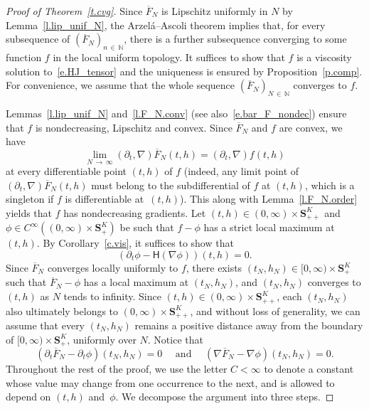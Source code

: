 \documentclass[10pt]{amsart}
\theoremstyle{definition}\newtheorem{defi}[theo]{Definition}\newtheorem{rema}[theo]{Remark}\newtheorem{exam}[theo]{Example}\newtheorem{exem}[theo]{Example}\newtheorem{nota}[theo]{Notation}
\newcommand{\N}{\mathbb{N}}
\renewcommand{\S}{\mathbf{S}}
\renewcommand{\H}{\mathsf{H}}
\renewcommand{\bar}{\overline}
\newcommand{\Ll}{\left}
\newcommand{\Rr}{\right}
\newcommand{\dr}{\partial}
\begin{document}
\begin{proof}[Proof of Theorem~\ref{t.cvg}]
Since $\bar F_N$ is Lipschitz uniformly in $N$ by Lemma~\ref{l.lip_unif_N}, the Arzelá--Ascoli theorem implies that, for every subsequence of $(\bar F_N)_{n\,\in\,\N}$, there is a further subsequence converging to some function $f$ in the local uniform topology. It suffices to show that $f$ is a viscosity solution to~\eqref{e.HJ_tensor} and the uniqueness is ensured by Proposition~\ref{p.comp}. For convenience, we assume that the whole sequence $(\bar F_N)_{N\,\in\,\N}$ converges to $f$.


Lemmas~\ref{l.lip_unif_N} and~\ref{l.F_N.conv} {(see also~\eqref{e.bar_F_nondec})} ensure that $f$ is nondecreasing, Lipschitz and convex. Since $\bar F_N$ and $f$ are convex, we have
\[
\lim_{N\,\to\,\infty}\Ll(\partial_t, \nabla\Rr)\bar F_N(t,h) = \Ll(\partial_t, \nabla\Rr)f(t,h)
\]
at every differentiable point $(t,h)$ of $f$ (indeed, any limit point of $(\partial_t, \nabla)\bar F_N(t,h)$ must belong to the subdifferential of $f$ at $(t,h)$, which is a singleton if $f$ is differentiable at~$(t,h)$). This along with Lemma~\ref{l.F_N.order} yields that $f$ has nondecreasing gradients. Let $(t,h)\in(0,\infty)\times \S^K_{++}$ and $\phi\in C^\infty((0,\infty)\times\S^K_+)$ be such that $f-\phi$ has a strict local maximum at $(t,h)$. By Corollary~\ref{c.vis}, it suffices to show that
\begin{equation}\label{e.eq.phi}
\Ll(\partial_t\phi-\H\Ll(\nabla\phi\Rr)\Rr)(t,h)=0.
\end{equation}
Since $\bar F_N$ converges locally uniformly to $f$, there exists $(t_N,h_N) \in [0,\infty) \times \S^K_+$ such that $\bar F_N - \phi$ has a local maximum at $(t_N,h_N)$, and $(t_N,h_N)$ converges to $(t,h)$ as $N$ tends to infinity. Since $(t,h) \in (0,\infty) \times \S^K_{++}$, each $(t_N,h_N)$ also ultimately belongs to $(0,\infty) \times \S^K_{++}$, and without loss of generality, we can assume that every $(t_N,h_N)$ remains a positive distance away from the boundary of $[0,\infty) \times \S^K_+$, uniformly over $N$. Notice that
\begin{equation}\label{e.gradient.equalities}
\Ll(\dr_t \bar F_N - \dr_t \phi\Rr)\Ll(t_N,h_N\Rr) = 0 \quad \text{ and } \quad \Ll(\nabla \bar F_N - \nabla \phi\Rr)\Ll(t_N,h_N\Rr) = 0.
\end{equation}
Throughout the rest of the proof, we use the letter $C < \infty$ to denote a constant whose value may change from one occurrence to the next, and is allowed to depend on $(t,h)$ and~$\phi$. We decompose the argument into three steps.


\end{proof}
\end{document}
